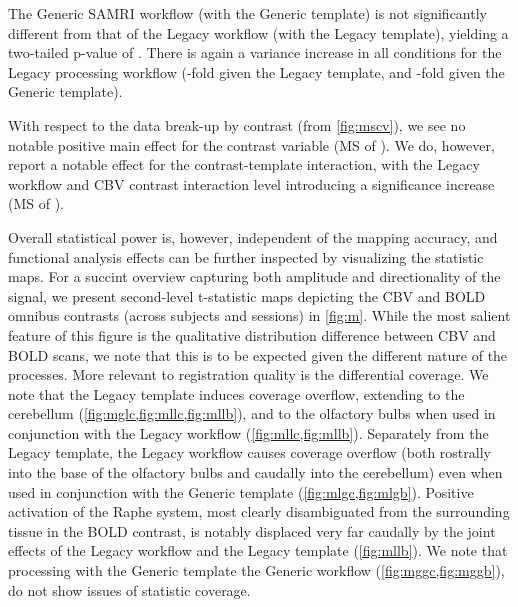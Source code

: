 The Generic SAMRI workflow (with the Generic template) is not significantly different from that of the Legacy workflow (with the Legacy template), yielding a two-tailed p-value of .
There is again a variance increase in all conditions for the Legacy processing workflow
(-fold
given the Legacy template, and
-fold
given the Generic template).

With respect to the data break-up by contrast (from \cref{fig:mscv}), we see no notable positive main effect for the contrast variable
(MS of
).
We do, however, report a notable effect for the contrast-template interaction, with the Legacy workflow and CBV contrast interaction level introducing a significance increase
(MS of
).

Overall statistical power is, however, independent of the mapping accuracy, and functional analysis effects can be further inspected by visualizing the statistic maps.
For a succint overview capturing both amplitude and directionality of the signal, we present second-level t-statistic maps depicting the CBV and BOLD omnibus contrasts (across subjects and sessions) in \cref{fig:m}.
While the most salient feature of this figure is the qualitative distribution difference between CBV and BOLD scans, we note that this is to be expected given the different nature of the processes.
More relevant to registration quality is the differential coverage.
We note that the Legacy template induces coverage overflow, extending to the cerebellum (\cref{fig:mglc,fig:mllc,fig:mllb}), and to the olfactory bulbs when used in conjunction with the Legacy workflow (\cref{fig:mllc,fig:mllb}).
Separately from the Legacy template, the Legacy workflow causes coverage overflow (both rostrally into the base of the olfactory bulbs and caudally into the cerebellum) even when used in conjunction with the Generic template (\cref{fig:mlgc,fig:mlgb}).
Positive activation of the Raphe system, most clearly disambiguated from the surrounding tissue in the BOLD contrast, is notably displaced very far caudally by the joint effects of the Legacy workflow and the Legacy template (\cref{fig:mllb}).
We note that processing with the Generic template the Generic workflow (\cref{fig:mggc,fig:mggb}), do not show issues of statistic coverage.

